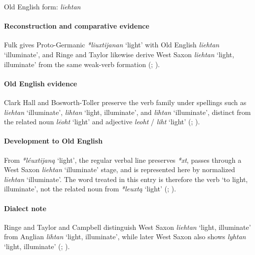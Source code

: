 \documentclass[
  british,
  a4paper,
]{article}
\providecommand{\Recon}[1]{\emph{*#1}}
\begin{document}
Old English form: \emph{līehtan}

\paragraph{Reconstruction and comparative
evidence}\label{reconstruction-and-comparative-evidence-44}

Fulk gives Proto-Germanic \Recon{liuxtijanan} `light' with Old English
\emph{līehtan} `illuminate', and Ringe and Taylor likewise derive West
Saxon {\emph{liehtan}} `light, illuminate' from the same weak-verb
formation (;
).

\paragraph{Old English evidence}\label{old-english-evidence-45}

Clark Hall and Bosworth-Toller preserve the verb family under spellings
such as \emph{liehtan} `illuminate', {\emph{lihtan}} `light,
illuminate', and \emph{līhtan} `illuminate', distinct from the related
noun \emph{lēoht} `light' and adjective \emph{leoht} / \emph{liht}
`light' (;
).

\paragraph{Development to Old
English}\label{development-to-old-english-45}

From \Recon{léuxtijaną} `light', the regular verbal line preserves
\emph{*xt}, passes through a West Saxon \emph{liehtan} `illuminate'
stage, and is represented here by normalized \emph{līehtan}
`illuminate'. The word treated in this entry is therefore the verb `to
light, illuminate', not the related noun from \Recon{leuxtą} `light'
(;
).

\paragraph{Dialect note}\label{dialect-note-3}

Ringe and Taylor and Campbell distinguish West Saxon {\emph{liehtan}}
`light, illuminate' from Anglian {\emph{lihtan}} `light, illuminate',
while later West Saxon also shows {\emph{lyhtan}} `light, illuminate'
(;
).
\end{document}
